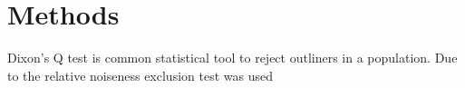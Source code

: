\chapter{Methods}

Dixon's Q test is common statistical tool to reject outliners in a population. Due to the relative noiseness  exclusion test was used 